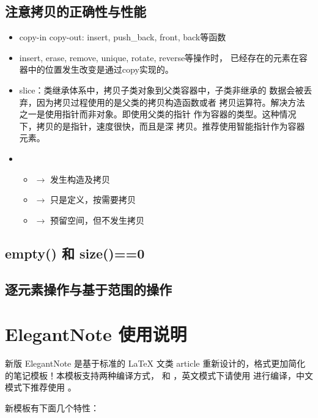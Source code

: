\documentclass[cn,geye,blue,14pt,normal]{elegantnote}
\begin{document}
\subsection{注意拷贝的正确性与性能}

\begin{itemize}
  \item copy-in copy-out: insert, push\_back, front, back等函数
  \item insert, erase, remove, unique, rotate, reverse等操作时，
        已经存在的元素在容器中的位置发生改变是通过copy实现的。
  \item slice：类继承体系中，拷贝子类对象到父类容器中，子类非继承的
        数据会被丢弃，因为拷贝过程使用的是父类的拷贝构造函数或者
        拷贝运算符。解决方法之一是使用指针而非对象。即使用父类的指针
        作为容器的类型。这种情况下，拷贝的是指针，速度很快，而且是深
        拷贝。推荐使用智能指针作为容器元素。
  \item 
    \begin{itemize} 
      \item {} $\rightarrow$ 发生构造及拷贝
      \item {} $\rightarrow$ 只是定义，按需要拷贝
      \item {} $\rightarrow$ 预留空间，但不发生拷贝
    \end{itemize}
\end{itemize}


\subsection{empty() 和 size()==0}


\subsection{逐元素操作与基于范围的操作}


\section{ElegantNote 使用说明}

新版 ElegantNote 是基于标准的 \LaTeX{} 文类 article 重新设计的，格式更加简化的笔记模板！本模板支持两种编译方式， 和 ，英文模式下请使用  进行编译，中文模式下推荐使用 。

新模板有下面几个特性：
\end{document}
